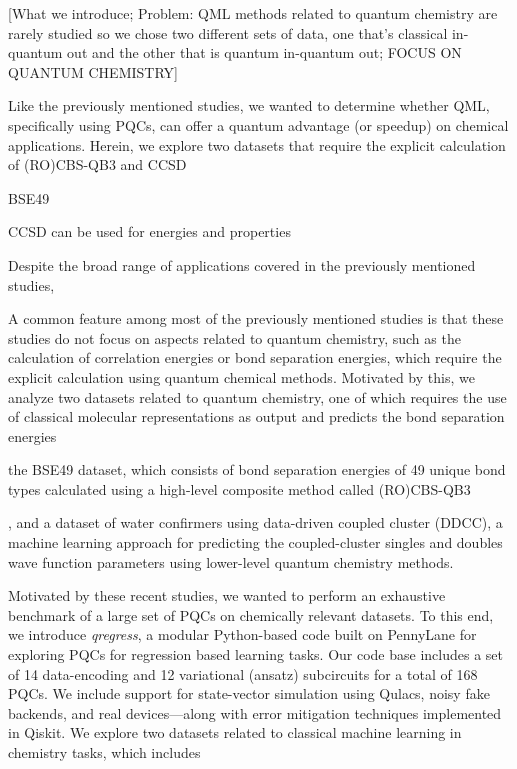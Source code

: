 \documentclass[journal=jacsat,manuscript=article]{achemso}
\begin{document}
[What we introduce; Problem: QML methods related to quantum chemistry are rarely studied so we chose two different sets of data, one that's classical in-quantum out and the other that is quantum in-quantum out; FOCUS ON QUANTUM CHEMISTRY]

Like the previously mentioned studies, we wanted to determine whether QML, specifically using PQCs, can offer a quantum advantage (or speedup) on chemical applications.
Herein, we explore two datasets that require the explicit calculation of (RO)CBS-QB3 and CCSD


BSE49 





CCSD can be used for energies and properties

Despite the broad range of applications covered in the previously mentioned studies, 


A common feature among most of the previously mentioned studies is that these studies do not focus on aspects related to quantum chemistry, such as the calculation of correlation energies or bond separation energies, which require the explicit calculation using quantum chemical methods.
Motivated by this, we analyze two datasets related to quantum chemistry, one of which requires the use of classical molecular representations as output and predicts the bond separation energies 

the BSE49 dataset\cite{prasad_bse49_2021}, which consists of bond separation energies of 49 unique bond types calculated using a high-level composite method called (RO)CBS-QB3

, and a dataset of water confirmers using data-driven coupled cluster (DDCC)\cite{townsend_data-driven_2019}, a machine learning approach for predicting the coupled-cluster singles and doubles wave function parameters using lower-level quantum chemistry methods.



Motivated by these recent studies, we wanted to perform an exhaustive benchmark of a large set of PQCs on chemically relevant datasets.
To this end,  we introduce \textit{qregress}, a modular Python-based code built on PennyLane for exploring PQCs for regression based learning tasks.
Our code base includes a set of 14 data-encoding and 12 variational (ansatz) subcircuits for a total of 168 PQCs.
We include support for state-vector simulation using Qulacs, noisy fake backends, and real devices---along with error mitigation techniques implemented in Qiskit. 
We explore two datasets related to classical machine learning in chemistry tasks, which includes 
\end{document}
